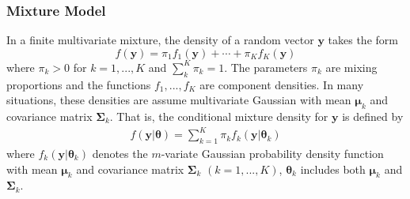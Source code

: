 \documentclass[12pt]{article}
\newcommand{\B}[0]{\mathbf}
\newcommand{\bs}[0]{\boldsymbol}
\begin{document}
\subsubsection{Mixture Model}
In a finite multivariate mixture, the density of a random vector $\B y$ takes the form
$$f(\B y)=\pi_{1}f_{1}(\B y)+\cdots+\pi_{K}f_{K}(\B y)$$
where $\pi_{k}>0$ for $k=1,...,K$ and $\sum^{K}_{k}\pi_{k}=1$. The parameters $\pi_{k}$ are mixing proportions and the functions $f_{1},...,f_{K}$ are component densities. In many situations, these densities are assume multivariate Gaussian with mean $\bs\mu_{k}$ and covariance matrix $\bs\Sigma_{k}$. That is, the conditional mixture density for $\B y$ is defined by
\begin{align}
f(\B y|\bs \theta)=\sum^{K}_{k=1}\pi_{k}f_{k}(\B y|\bs\theta_{k}) \label{mixdens}
\end{align}
where $f_{k}(\B y|\bs\theta_{k})$ denotes the $m$-variate Gaussian probability density function with mean $\bs\mu_{k}$ and covariance matrix $\bs\Sigma_{k}$ $(k=1,...,K)$, $\bs\theta_{k}$ includes both $\bs\mu_{k}$ and $\bs\Sigma_{k}$. 
\end{document}
